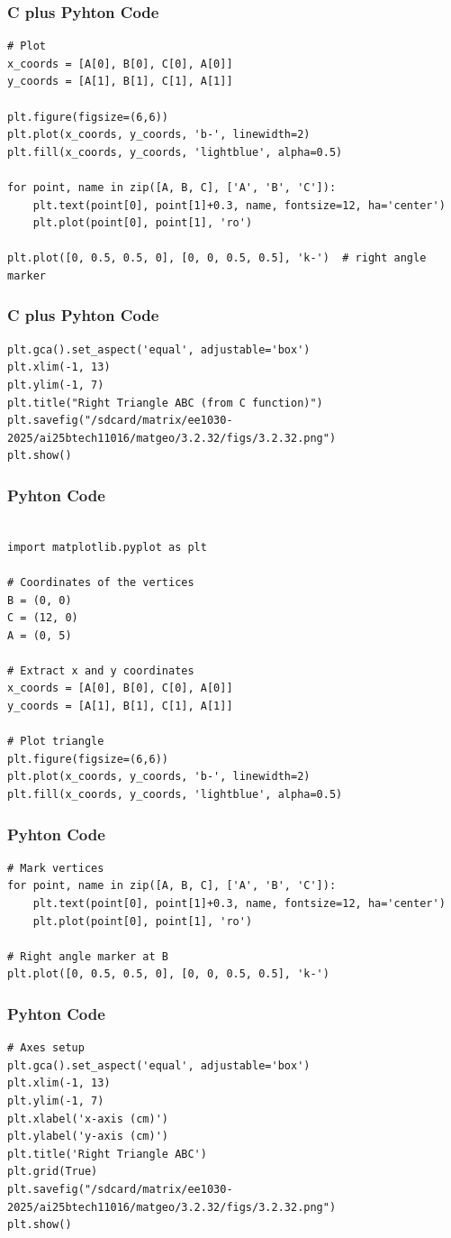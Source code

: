 \documentclass{beamer}
\begin{document}
\begin{frame}[fragile]
    \frametitle{C plus Pyhton Code}
\begin{lstlisting}
# Plot
x_coords = [A[0], B[0], C[0], A[0]]
y_coords = [A[1], B[1], C[1], A[1]]

plt.figure(figsize=(6,6))
plt.plot(x_coords, y_coords, 'b-', linewidth=2)
plt.fill(x_coords, y_coords, 'lightblue', alpha=0.5)

for point, name in zip([A, B, C], ['A', 'B', 'C']):
    plt.text(point[0], point[1]+0.3, name, fontsize=12, ha='center')
    plt.plot(point[0], point[1], 'ro')

plt.plot([0, 0.5, 0.5, 0], [0, 0, 0.5, 0.5], 'k-')  # right angle marker
\end{lstlisting}
\end{frame}
\begin{frame}[fragile]
    \frametitle{C plus Pyhton Code}
\begin{lstlisting}
plt.gca().set_aspect('equal', adjustable='box')
plt.xlim(-1, 13)
plt.ylim(-1, 7)
plt.title("Right Triangle ABC (from C function)")
plt.savefig("/sdcard/matrix/ee1030-2025/ai25btech11016/matgeo/3.2.32/figs/3.2.32.png")
plt.show()
\end{lstlisting}
\end{frame}
\begin{frame}[fragile]
    \frametitle{Pyhton Code}
\begin{lstlisting}

import matplotlib.pyplot as plt

# Coordinates of the vertices
B = (0, 0)
C = (12, 0)
A = (0, 5)

# Extract x and y coordinates
x_coords = [A[0], B[0], C[0], A[0]]
y_coords = [A[1], B[1], C[1], A[1]]

# Plot triangle
plt.figure(figsize=(6,6))
plt.plot(x_coords, y_coords, 'b-', linewidth=2)
plt.fill(x_coords, y_coords, 'lightblue', alpha=0.5)
\end{lstlisting}
\end{frame}
\begin{frame}[fragile]
    \frametitle{Pyhton Code}
\begin{lstlisting}
# Mark vertices
for point, name in zip([A, B, C], ['A', 'B', 'C']):
    plt.text(point[0], point[1]+0.3, name, fontsize=12, ha='center')
    plt.plot(point[0], point[1], 'ro')

# Right angle marker at B
plt.plot([0, 0.5, 0.5, 0], [0, 0, 0.5, 0.5], 'k-')
\end{lstlisting}
\end{frame}
\begin{frame}[fragile]
    \frametitle{Pyhton Code}
\begin{lstlisting}
# Axes setup
plt.gca().set_aspect('equal', adjustable='box')
plt.xlim(-1, 13)
plt.ylim(-1, 7)
plt.xlabel('x-axis (cm)')
plt.ylabel('y-axis (cm)')
plt.title('Right Triangle ABC')
plt.grid(True)
plt.savefig("/sdcard/matrix/ee1030-2025/ai25btech11016/matgeo/3.2.32/figs/3.2.32.png")
plt.show()
\end{lstlisting}
\end{frame}
\end{document}
